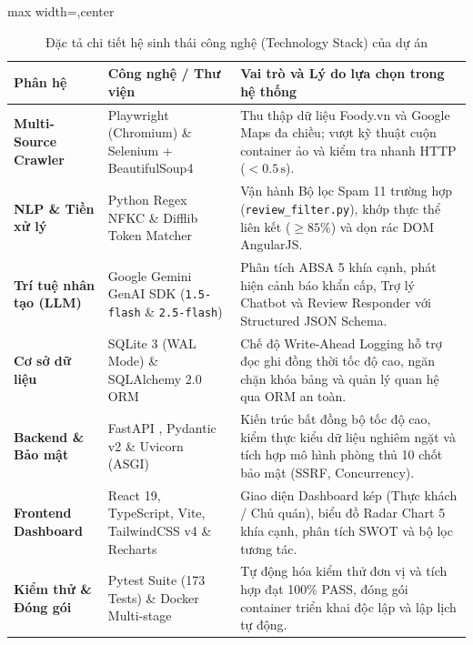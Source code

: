 \documentclass[12pt, a4paper]{article}
\begin{document}
\begin{table}[!htbp]
\centering
\caption{Đặc tả chi tiết hệ sinh thái công nghệ (Technology Stack) của dự án}
\vspace{0.15cm}
\footnotesize
\renewcommand{\arraystretch}{0.95}
\begin{adjustbox}{max width=\textwidth,center}
\begin{tabularx}{0.97\textwidth}{l p{4.2cm} X}
\toprule
\rowcolor{blue!8}
\textbf{Phân hệ} & \textbf{Công nghệ / Thư viện} & \textbf{Vai trò và Lý do lựa chọn trong hệ thống} \\
\midrule
\textbf{Multi-Source Crawler} & Playwright (Chromium) \& Selenium + BeautifulSoup4 & Thu thập dữ liệu Foody.vn và Google Maps đa chiều; vượt kỹ thuật cuộn container ảo và kiểm tra nhanh HTTP ($<0.5\,\mathrm{s}$). \\
\addlinespace[2pt]
\textbf{NLP \& Tiền xử lý} & Python Regex NFKC \& Difflib Token Matcher & Vận hành Bộ lọc Spam 11 trường hợp (\texttt{review\_filter.py}), khớp thực thể liên kết ($\ge 85\%$) và dọn rác DOM AngularJS. \\
\addlinespace[2pt]
\textbf{Trí tuệ nhân tạo (LLM)} & Google Gemini GenAI SDK (\texttt{1.5-flash} \& \texttt{2.5-flash}) & Phân tích ABSA 5 khía cạnh, phát hiện cảnh báo khẩn cấp, Trợ lý Chatbot và Review Responder với Structured JSON Schema. \\
\addlinespace[2pt]
\textbf{Cơ sở dữ liệu} & SQLite 3 (WAL Mode) \& SQLAlchemy 2.0 ORM & Chế độ Write-Ahead Logging hỗ trợ đọc ghi đồng thời tốc độ cao, ngăn chặn khóa bảng và quản lý quan hệ qua ORM an toàn. \\
\addlinespace[2pt]
\textbf{Backend \& Bảo mật} & FastAPI \cite{ramirez2025fastapi}, Pydantic v2 \& Uvicorn (ASGI) & Kiến trúc bất đồng bộ tốc độ cao, kiểm thực kiểu dữ liệu nghiêm ngặt và tích hợp mô hình phòng thủ 10 chốt bảo mật (SSRF, Concurrency). \\
\addlinespace[2pt]
\textbf{Frontend Dashboard} & React 19, TypeScript, Vite, TailwindCSS v4 \& Recharts & Giao diện Dashboard kép (Thực khách / Chủ quán), biểu đồ Radar Chart 5 khía cạnh, phân tích SWOT và bộ lọc tương tác. \\
\addlinespace[2pt]
\textbf{Kiểm thử \& Đóng gói} & Pytest Suite (173 Tests) \& Docker Multi-stage & Tự động hóa kiểm thử đơn vị và tích hợp đạt 100\% PASS, đóng gói container triển khai độc lập và lập lịch tự động. \\
\bottomrule
\end{tabularx}
\end{adjustbox}
\end{table}
\end{document}
